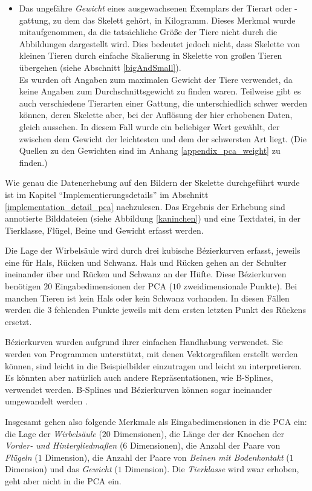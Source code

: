 \begin{itemize}
  \item Das ungefähre \emph{Gewicht} eines ausgewachsenen Exemplars der Tierart oder -gattung, zu dem das Skelett gehört, in Kilogramm. Dieses Merkmal wurde mitaufgenommen, da die tatsächliche Größe der Tiere nicht durch die Abbildungen dargestellt wird. Dies bedeutet jedoch nicht, dass Skelette von kleinen Tieren durch einfache Skalierung in Skelette von großen Tieren übergehen (siehe Abschnitt \ref{bigAndSmall}).\\
  Es wurden oft Angaben zum maximalen Gewicht der Tiere verwendet, da keine Angaben zum Durchschnittsgewicht zu finden waren. Teilweise gibt es auch verschiedene Tierarten einer Gattung, die unterschiedlich schwer werden können, deren Skelette aber, bei der Auflösung der hier erhobenen Daten, gleich aussehen. In diesem Fall wurde ein beliebiger Wert gewählt, der zwischen dem Gewicht der leichtesten und dem der schwersten Art liegt. (Die Quellen zu den Gewichten sind im Anhang \ref{appendix_pca_weight} zu finden.)
 \end{itemize}

 Wie genau die Datenerhebung auf den Bildern der Skelette durchgeführt wurde ist im Kapitel "`Implementierungsdetails"' im Abschnitt \ref{implementation_detail_pca} nachzulesen.
 Das Ergebnis der Erhebung sind annotierte Bilddateien (siehe \zb Abbildung \ref{kaninchen}) und eine Textdatei, in der Tierklasse, Flügel, Beine und Gewicht erfasst werden.
 
 Die Lage der Wirbelsäule wird durch drei kubische Bézierkurven erfasst, jeweils eine für Hals, Rücken und Schwanz. Hals und Rücken gehen an der Schulter ineinander über und Rücken und Schwanz an der Hüfte.
 Diese Bézierkurven benötigen $20$ Eingabedimensionen der PCA ($10$ zweidimensionale Punkte). Bei manchen Tieren ist kein Hals oder kein Schwanz vorhanden. In diesen Fällen werden die $3$ fehlenden Punkte jeweils mit dem ersten \bzw letzten Punkt des Rückens ersetzt.
 
 Bézierkurven wurden aufgrund ihrer einfachen Handhabung verwendet. Sie werden von Programmen unterstützt, mit denen Vektorgrafiken erstellt werden können, sind leicht in die Beispielbilder einzutragen und leicht zu interpretieren. Es könnten aber natürlich auch andere Repräsentationen, wie B-Splines, verwendet werden. B-Splines und Bézierkurven können sogar ineinander umgewandelt werden \cite{BezierAndBSplineTechniques}.
 
 Insgesamt gehen also folgende Merkmale als Eingabedimensionen in die PCA ein:
 die Lage der \emph{Wirbelsäule} ($20$ Dimensionen), die Länge der der Knochen der \emph{Vorder- und Hintergliedmaßen} ($6$ Dimensionen), die Anzahl der Paare von \emph{Flügeln} ($1$ Dimension), die Anzahl der Paare von \emph{Beinen mit Bodenkontakt} ($1$ Dimension) und das \emph{Gewicht} ($1$ Dimension). Die \emph{Tierklasse} wird zwar erhoben, geht aber nicht in die PCA ein.
 
